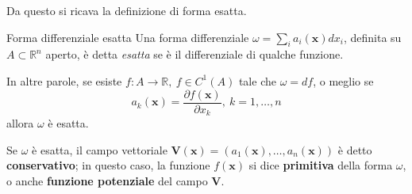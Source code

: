 \documentclass[11pt, a4paper]{scrartcl}
\theoremstyle{definition}
\numberwithin{esempio}{section}
\theoremstyle{definition}
\numberwithin{obs}{section}
\numberwithin{nota}{section}
\numberwithin{equation}{subsection}
\begin{document}
Da questo si ricava la definizione di forma esatta.
\begin{definizione}
	{Forma differenziale esatta}{}
	Una forma differenziale $\omega = \sum_{i}^{} a_i(\mathbf{x} ) dx_i$, definita su $A \subset \mathbb{R}^n$ aperto, \`e detta \textit{esatta} se \`e il differenziale di qualche funzione.

	In altre parole, se esiste $f:A \to \mathbb{R}, \ f \in C^1(A)$ tale che $\omega = df$, o meglio se
	\[
	a_k (\mathbf{x} ) = \frac{\partial f(\mathbf{x} )}{\partial x_k} , \ k=1, \ldots, n
	\] 
	allora $\omega$ \`e esatta.
\end{definizione}
\noindent Se $\omega$ \`e esatta, il campo vettoriale $\mathbf{V} (\mathbf{x} ) = (a_1(\mathbf{x} ) ,\ldots, a_n(\mathbf{x} ))$ \`e detto \textbf{conservativo}; in questo caso, la funzione $f(\mathbf{x} )$ si dice \textbf{primitiva} della forma $\omega$, o anche \textbf{funzione potenziale} del campo $\mathbf{V} $.
\end{document}

